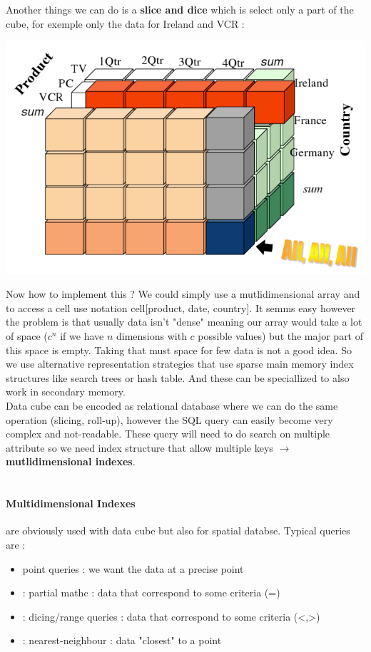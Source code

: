 \documentclass[12pt,a4paper]{article}
\begin{document}
Another things we can do is a \textbf{slice and dice} which is select only a part of the cube, for exemple only the data for Ireland and VCR :
\begin{center}
\includegraphics[scale=0.4]{img/img51.png}
\end{center}
Now how to implement this ? We could simply use a mutlidimensional array and to access a cell use notation cell[product, date, country]. It semms easy however the problem is that usually data isn't "dense" meaning our array would take a lot of space ($c^n$ if we have $n$ dimensions with $c$ possible values) but the major part of this space is empty. Taking that must space for few data is not a good idea. So we use alternative representation strategies that use sparse main memory index structures like search trees or hash table. And these can be speciallized to also work in secondary memory.\\
Data cube can be encoded as relational database where we can do the same operation (slicing, roll-up), however the SQL query can easily become very complex and not-readable.
These query will need to do search on multiple attribute so we need index structure that allow multiple keys $\longrightarrow$ \textbf{mutlidimensional indexes}.\\
\\
\paragraph{Multidimensional Indexes } are obviously used with data cube but also for spatial databse. Typical queries are : 
\begin{itemize}
\item point queries : we want the data at a precise point
\item : partial mathc : data that correspond to some criteria (=)
\item : dicing/range queries : data that correspond to some criteria (<,>)
\item : nearest-neighbour : data "closest" to a point
\end{itemize}
\end{document}

